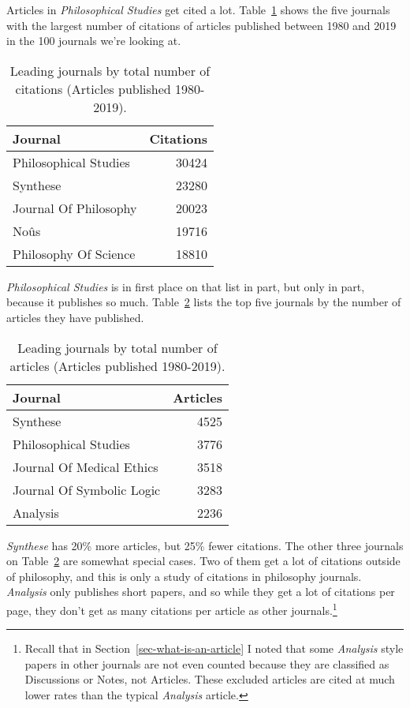 \documentclass[
  10pt,
  letterpaper,
  DIV=11,
  numbers=noendperiod,
  twoside]{scrartcl}
\begin{document}
Articles in \emph{Philosophical Studies} get cited a lot.
Table~\ref{tbl-all-cites} shows the five journals with the largest
number of citations of articles published between 1980 and 2019 in the
100 journals we're looking at.

\begin{longtable}[]{@{}lr@{}}

\caption{\label{tbl-all-cites}Leading journals by total number of
citations (Articles published 1980-2019).}

\tabularnewline

\toprule\noalign{}
Journal & Citations \\
\midrule\noalign{}
\endhead
\bottomrule\noalign{}
\endlastfoot
Philosophical Studies & 30424 \\
Synthese & 23280 \\
Journal Of Philosophy & 20023 \\
Noûs & 19716 \\
Philosophy Of Science & 18810 \\

\end{longtable}

\emph{Philosophical Studies} is in first place on that list in part, but
only in part, because it publishes so much. Table~\ref{tbl-all-articles}
lists the top five journals by the number of articles they have
published.

\begin{longtable}[]{@{}lr@{}}

\caption{\label{tbl-all-articles}Leading journals by total number of
articles (Articles published 1980-2019).}

\tabularnewline

\toprule\noalign{}
Journal & Articles \\
\midrule\noalign{}
\endhead
\bottomrule\noalign{}
\endlastfoot
Synthese & 4525 \\
Philosophical Studies & 3776 \\
Journal Of Medical Ethics & 3518 \\
Journal Of Symbolic Logic & 3283 \\
Analysis & 2236 \\

\end{longtable}

\emph{Synthese} has 20\% more articles, but 25\% fewer citations. The
other three journals on Table~\ref{tbl-all-articles} are somewhat
special cases. Two of them get a lot of citations outside of philosophy,
and this is only a study of citations in philosophy journals.
\emph{Analysis} only publishes short papers, and so while they get a lot
of citations per page, they don't get as many citations per article as
other journals.\footnote{Recall that in
  Section~\ref{sec-what-is-an-article} I noted that some \emph{Analysis}
  style papers in other journals are not even counted because they are
  classified as Discussions or Notes, not Articles. These excluded
  articles are cited at much lower rates than the typical
  \emph{Analysis} article.}
\end{document}
